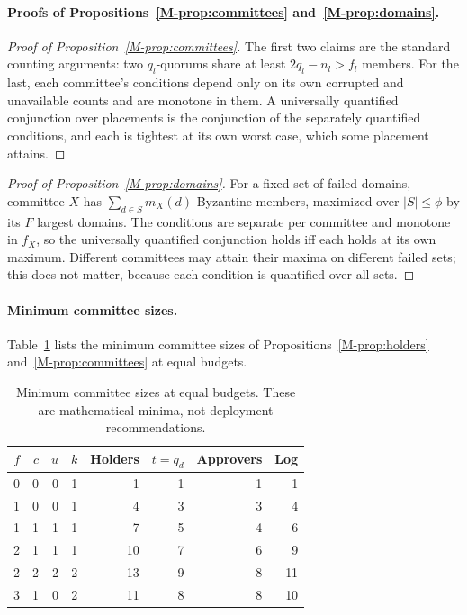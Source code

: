 \documentclass[pdflatex,sn-mathphys-num]{sn-jnl}
\theoremstyle{plain}
\begin{document}
\paragraph{Proofs of Propositions~\ref{M-prop:committees} and~\ref{M-prop:domains}.}
\begin{proof}[Proof of Proposition~\ref{M-prop:committees}]
The first two claims are the standard counting arguments: two $q_l$-quorums share at least $2q_l-n_l>f_l$ members. For the last, each committee's conditions depend only on its own corrupted and unavailable counts and are monotone in them. A universally quantified conjunction over placements is the conjunction of the separately quantified conditions, and each is tightest at its own worst case, which some placement attains.
\end{proof}
\begin{proof}[Proof of Proposition~\ref{M-prop:domains}]
For a fixed set of failed domains, committee $X$ has $\sum_{d\in S}m_X(d)$ Byzantine members, maximized over $|S|\le\phi$ by its $F$ largest domains. The conditions are separate per committee and monotone in $f_X$, so the universally quantified conjunction holds iff each holds at its own maximum. Different committees may attain their maxima on different failed sets; this does not matter, because each condition is quantified over all sets.
\end{proof}

\paragraph{Minimum committee sizes.}
Table~\ref{tab:sensitivity} lists the minimum committee sizes of Propositions~\ref{M-prop:holders} and~\ref{M-prop:committees} at equal budgets.

\begin{table}[htbp]
\caption{Minimum committee sizes at equal budgets. These are mathematical minima, not deployment recommendations.}\label{tab:sensitivity}
\centering\footnotesize\setlength{\tabcolsep}{3.5pt}
\begin{tabular}{@{}rrrrrrrr@{}}\toprule
$f$&$c$&$u$&$k$&Holders&$t=q_d$&Approvers&Log\\\midrule
0&0&0&1&1&1&1&1\\
1&0&0&1&4&3&3&4\\
1&1&1&1&7&5&4&6\\
2&1&1&1&10&7&6&9\\
2&2&2&2&13&9&8&11\\
3&1&0&2&11&8&8&10\\\bottomrule
\end{tabular}
\end{table}
\end{document}

